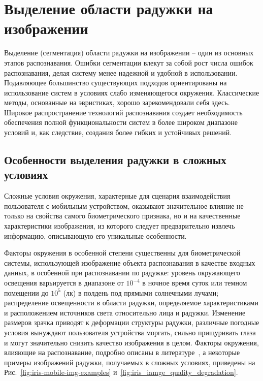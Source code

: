 \chapter{Выделение области радужки на изображении}
\label{chapter:segmentation}

Выделение (сегментация) области радужки на изображении -- один из основных этапов распознавания. Ошибки сегментации влекут за собой рост числа ошибок распознавания, делая систему менее надежной и удобной в использовании. Подавляющее большинство существующих подходов ориентированы на использование систем в условиях слабо изменяющегося окружения. Классические методы, основанные на эвристиках, хорошо зарекомендовали себя здесь. Широкое распространение технологий распознавания создает необходимость обеспечения полной функциональности систем в более широком диапазоне условий и, как следствие, создания более гибких и устойчивых решений.

\section{Особенности выделения радужки в сложных условиях}
\label{sec:hard_condition_segm_features}

Сложные условия окружения, характерные для сценария взаимодействия пользователя с мобильным устройством, оказывают значительное влияние не только на свойства самого биометрического признака, но и на качественные характеристики изображения, из которого следует предварительно извлечь информацию, описывающую его уникальные особенности.

Факторы окружения в особенной степени существенны для биометрической системы, использующей изображение объекта распознавания в качестве входных данных, в особенной при распознавании по радужке: уровень окружающего освещения варьируется в диапазоне от $10^{-4}$ в ночное время суток или темном помещении до $10^5$ (лк) в полдень под прямыми солнечными лучами; распределение освещенности в области радужки, определяемое характеристиками и расположением источников света относительно лица и радужки. Изменение размеров зрачка приводят к деформации структуры радужки, различные погодные условия вынуждают пользователя устройства моргать, сильно прищуривать глаза и могут значительно снизить качество изображения в целом. Факторы окружения, влияющие на распознавание, подробно описаны в литературе~\cite{raja_2014,thavalengal_2016,btas_competition_2016,odinokikh_2018}, а некоторые примеры изображений радужки, получаемых в сложных условиях, приведены на Рис.~\ref{fig:iris-mobile-img-examples} и~\ref{fig:iris_iamge_quality_degradation}.

